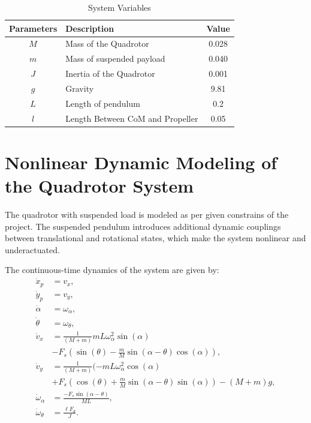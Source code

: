 \documentclass[a4paper,11pt,oneside]{book}
\begin{document}
\begin{table}[h]
    \centering
    \begin{tabular}{|c|l|c|}
        \hline
        \textbf{Parameters} & \textbf{Description} & \textbf{Value} \\ \hline
        $M$ & Mass of the Quadrotor & 0.028 \\
        $m$ & Mass of suspended payload & 0.040 \\
        $J$ & Inertia of the Quadrotor & 0.001 \\
        $g$ & Gravity & 9.81 \\
        $L$ & Length of pendulum & 0.2 \\
        $l$ & Length Between CoM and Propeller & 0.05 \\ \hline
    \end{tabular}
    \caption{System Variables}
\end{table}

\section{Nonlinear Dynamic Modeling of the Quadrotor System}
\label{sec:Nonlinear_Dynamics}

The quadrotor with suspended load is modeled as per given constrains of the project. 
The suspended pendulum introduces additional dynamic couplings between translational and rotational states, which make the system nonlinear and underactuated.  

The continuous-time dynamics of the system are given by:
\begin{align}
\dot{x}_p &= v_x, \\
\dot{y}_p &= v_y, \\
\dot{\alpha} &= \omega_\alpha, \\
\dot{\theta} &= \omega_\theta, \\
\dot{v}_x &= \frac{1}{(M+m)}mL \omega_\alpha^2 \sin(\alpha) \nonumber\\
 &-  F_s \left(\sin(\theta) - \frac{m}{M}\sin(\alpha-\theta)\cos(\alpha)\right), \\
\dot{v}_y &= \frac{1}{(M+m)}(-mL \omega_\alpha^2 \cos(\alpha) \nonumber\\
 &+ F_s \left(\cos(\theta) + \frac{m}{M}\sin(\alpha-\theta)\sin(\alpha)\right) - (M+m)g, \\
\dot{\omega}_\alpha &= \frac{-F_s \sin(\alpha - \theta)}{M L}, \\
\dot{\omega}_\theta &= \frac{\ell F_d}{J}.
\end{align}
\end{document}
